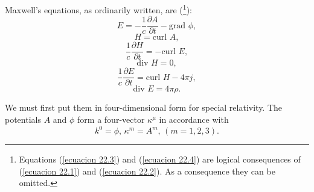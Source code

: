 Maxwell's equations, as ordinarily written, are (\footnote{Equations (\ref{ecuacion 22.3}) and (\ref{ecuacion 
22.4}) are logical consequences of (\ref{ecuacion 22.1}) and (\ref{ecuacion 22.2}). As a consequence they can be 
omitted.}):
\begin{equation}
 \label{ecuacion 23.1}
 E = - \frac{1}{c}\frac{\partial A}{\partial t} - \mbox{grad }\phi,
\end{equation}
\begin{equation}
 \label{ecuacion 23.2}
 H = \mbox{curl } A,
\end{equation}
\begin{equation}
 \label{ecuacion 23.3}
 \frac{1}{c}\frac{\partial H}{\partial t} = - \mbox{curl } E,
\end{equation}
\begin{equation}
 \label{ecuacion 23.4}
 \mbox{div } H = 0,
\end{equation}
\begin{equation}
 \label{ecuacion 23.5}
 \frac{1}{c}\frac{\partial E}{\partial t} = \mbox{curl } H - 4 \pi j,
\end{equation}
\begin{equation}
 \label{ecuacion 23.6}
 \mbox{div } E = 4 \pi \rho.
\end{equation}

We must first put them in four-dimensional form for special relativity. The potentials $A$ and $\phi$ form a 
four-vector $\kappa^\mu$ in accordance with 
\[
k^0 = \phi \mbox{, } \kappa^m = A^m\mbox{, }(m=1,2,3).
\]

